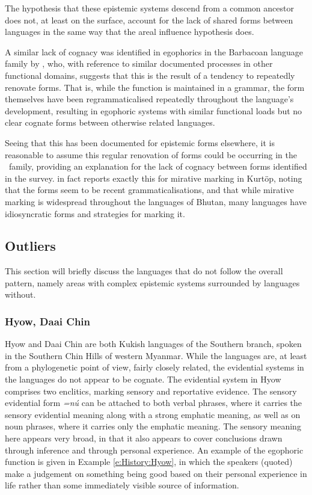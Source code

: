 The hypothesis that these epistemic systems descend from a common ancestor does not, at least on the surface, account for the lack of shared forms between languages in the same way that the areal influence hypothesis does.

A similar lack of cognacy was identified in egophorics in the Barbacoan language family by , who, with reference to similar documented processes in other functional domains, suggests that this is the result of a tendency to repeatedly renovate forms. That is, while the function is maintained in a grammar, the form themselves have been regrammaticalised repeatedly throughout the language's development, resulting in egophoric systems with similar functional loads but no clear cognate forms between otherwise related languages.

Seeing that this has been documented for epistemic forms elsewhere, it is reasonable to assume this regular renovation of forms could be occurring in the \lfam\ family, providing an explanation for the lack of cognacy between forms identified in the survey.  in fact reports exactly this for mirative marking in Kurtöp, noting that the forms seem to be recent grammaticalisations, and that while mirative marking is widespread throughout the languages of Bhutan, many languages have idiosyncratic forms and strategies for marking it.

\subsection{Outliers}\label{ss:History:Outliers}
This section will briefly discuss the languages that do not follow the overall pattern, namely areas with complex epistemic systems surrounded by languages without. 

\subsubsection{Hyow, Daai Chin}
Hyow \cite{Zakaria2018} and Daai Chin \cite{SoHartmann2009} are both Kukish languages of the Southern branch, spoken in the Southern Chin Hills of western Myanmar. While the languages are, at least from a phylogenetic point of view, fairly closely related, the evidential systems in the languages do not appear to be cognate.
The evidential system in Hyow \cite[Kukish: Myanmar,][486]{Zakaria2018} comprises two enclitics, marking sensory and reportative evidence. The sensory evidential form \textit{=nú} can be attached to both verbal phrases, where it carries the sensory evidential meaning along with a strong emphatic meaning, as well as on noun phrases, where it carries only the emphatic meaning. The sensory meaning here appears very broad, in that it also appears to cover conclusions drawn through inference and through personal experience. An example of the egophoric function is given in Example \ref{e:History:Hyow}, in which the speakers (quoted) make a judgement on something being good based on their personal experience in life rather than some immediately visible source of information.


